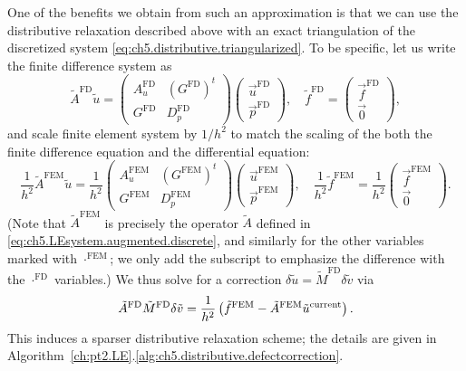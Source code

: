 One of the benefits we obtain from such an approximation is that we can use the distributive relaxation described above with an exact triangulation of the discretized system \eqref{eq:ch5.distributive.triangularized}. To be specific, let us write the finite difference system as
\begin{equation*}
\tilde{A}^{\text{FD}} \tilde{u} =
\begin{pmatrix} A_u^{\text{FD}} & (G^{\text{FD}})^t \\ G^{\text{FD}} & D_p^{\text{FD}} \end{pmatrix}
\begin{pmatrix} \vec{u}^{\text{FD}} \\ \vec{p}^{\text{FD}} \end{pmatrix}, \quad
\tilde{f}^{\text{FD}} = \begin{pmatrix} \vec{f}^{\text{FD}} \\ \vec{0} \end{pmatrix},
\end{equation*}
and scale finite element system by $1/h^2$ to match the scaling of the both the finite difference equation and the differential equation:
\begin{equation*}
\frac{1}{h^2} \tilde{A}^{\text{FEM}} \tilde{u} =
\frac{1}{h^2} \begin{pmatrix} A_u^{\text{FEM}} & (G^{\text{FEM}})^t \\ G^{\text{FEM}} & D_p^{\text{FEM}} \end{pmatrix}
\begin{pmatrix} \vec{u}^{\text{FEM}} \\ \vec{p}^{\text{FEM}} \end{pmatrix}, \quad
\frac{1}{h^2} \tilde{f}^{\text{FEM}} = \frac{1}{h^2} \begin{pmatrix} \vec{f}^{\text{FEM}} \\ \vec{0} \end{pmatrix}.
\end{equation*}
(Note that $\tilde{A}^{\text{FEM}}$ is precisely the operator $\tilde{A}$ defined in \eqref{eq:ch5.LEsystem.augmented.discrete}, and similarly for the other variables marked with $\cdot^{\text{FEM}}$; we only add the subscript to emphasize the difference with the $\cdot^{\text{FD}}$ variables.) We thus solve for a correction $\delta\tilde{u} = \tilde{M}^{\text{FD}} \delta\tilde{v}$ via
\begin{equation*}
\tilde{A}^{\text{FD}} \tilde{M}^{\text{FD}} \delta\tilde{v} = \frac{1}{h^2} \left( \tilde{f}^{\text{FEM}} - \tilde{A}^{\text{FEM}} \tilde{u}^{\text{current}} \right).
\end{equation*}
This induces a sparser distributive relaxation scheme; the details are given in Algorithm~\ref{ch:pt2.LE}.\ref{alg:ch5.distributive.defectcorrection}.

